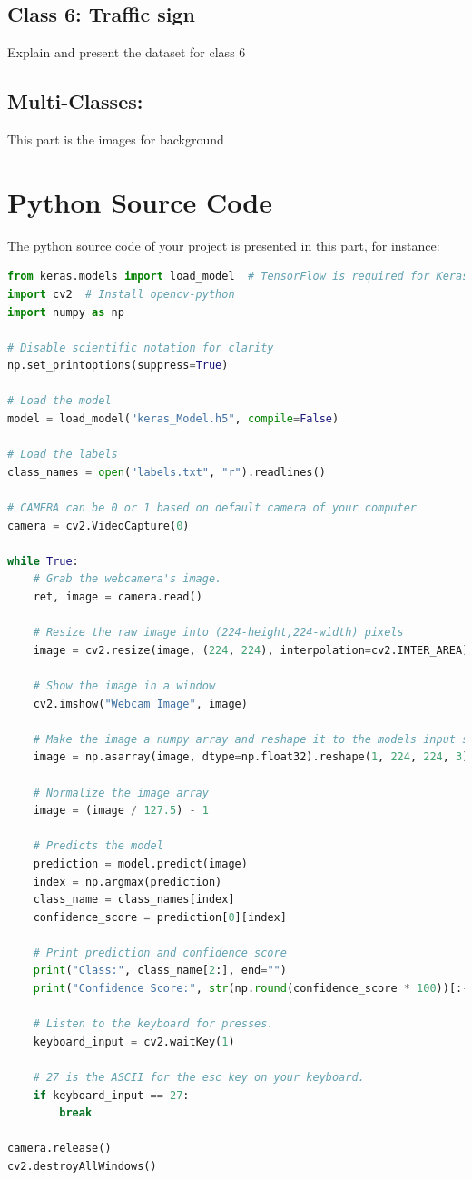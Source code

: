 \documentclass[a4paper,11pt]{article}
\theoremstyle{mytheor}
\begin{document}
\subsection{Class 6: Traffic sign}
Explain and present the dataset for class 6
\subsection{Multi-Classes:}
This part is the images for background

\section{Python Source Code}

The python source code of your project is presented in this part, for instance:

\begin{lstlisting}[language=Python, caption= Example of your Python code, label=test_float]
from keras.models import load_model  # TensorFlow is required for Keras to work
import cv2  # Install opencv-python
import numpy as np

# Disable scientific notation for clarity
np.set_printoptions(suppress=True)

# Load the model
model = load_model("keras_Model.h5", compile=False)

# Load the labels
class_names = open("labels.txt", "r").readlines()

# CAMERA can be 0 or 1 based on default camera of your computer
camera = cv2.VideoCapture(0)

while True:
    # Grab the webcamera's image.
    ret, image = camera.read()

    # Resize the raw image into (224-height,224-width) pixels
    image = cv2.resize(image, (224, 224), interpolation=cv2.INTER_AREA)

    # Show the image in a window
    cv2.imshow("Webcam Image", image)

    # Make the image a numpy array and reshape it to the models input shape.
    image = np.asarray(image, dtype=np.float32).reshape(1, 224, 224, 3)

    # Normalize the image array
    image = (image / 127.5) - 1

    # Predicts the model
    prediction = model.predict(image)
    index = np.argmax(prediction)
    class_name = class_names[index]
    confidence_score = prediction[0][index]

    # Print prediction and confidence score
    print("Class:", class_name[2:], end="")
    print("Confidence Score:", str(np.round(confidence_score * 100))[:-2], "%")

    # Listen to the keyboard for presses.
    keyboard_input = cv2.waitKey(1)

    # 27 is the ASCII for the esc key on your keyboard.
    if keyboard_input == 27:
        break

camera.release()
cv2.destroyAllWindows()

\end{lstlisting}
\end{document}

